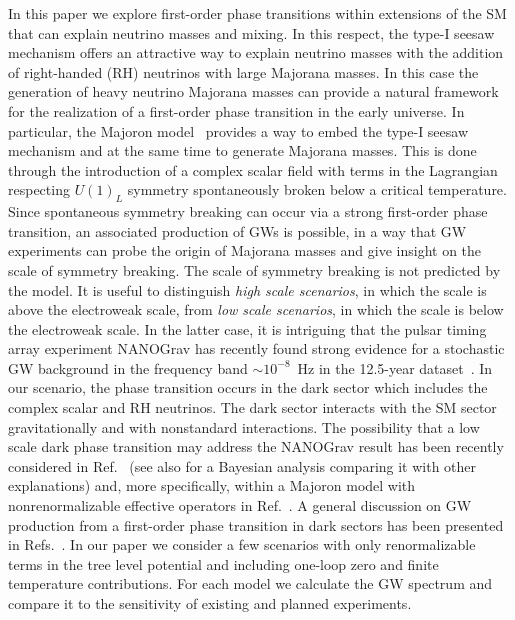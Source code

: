 \documentclass[a4paper,11pt]{article}
\begin{document}
In this paper we explore first-order phase transitions within extensions of the
SM that can explain neutrino masses and mixing. In this respect, the type-I seesaw mechanism 
offers an attractive way to explain neutrino masses with the addition of right-handed (RH) neutrinos with large Majorana masses. 
In this case the generation of heavy neutrino Majorana masses can provide a natural framework for the realization
of a first-order phase transition in the early universe. In particular, the Majoron model~\cite{Chikashige:1980ui} provides a way to embed
the type-I seesaw mechanism and at the same time to generate Majorana masses.  This is done through
the introduction of a complex scalar field with terms in the Lagrangian respecting $U(1)_L$ symmetry
spontaneously broken below a critical temperature.   Since spontaneous symmetry breaking can occur via a strong first-order phase transition, 
an associated production of GWs is possible, in a way that  GW experiments can probe the origin of Majorana masses and give insight 
on the scale of symmetry breaking.  
The scale of symmetry breaking is not predicted by the model. It is useful to distinguish {\it high scale scenarios}, in which the scale is above the electroweak scale, from {\it low scale scenarios},
in which the scale is below the electroweak scale. In the latter
case, it is  intriguing that the pulsar timing array experiment
NANOGrav has recently found  strong evidence for a stochastic GW background in the frequency band 
$\sim 10^{-8}$~Hz in the 12.5-year dataset~\cite{Arzoumanian:2020vkk}.
In our scenario, the phase transition occurs in the dark sector which includes the complex scalar and RH neutrinos.
The dark sector interacts with the SM sector gravitationally and with nonstandard interactions. 
The possibility that a low scale dark phase transition may address the NANOGrav result has been recently 
considered in Ref.~\cite{Nakai:2020oit} (see also \cite{Bian:2021lmz} for a Bayesian analysis comparing it with other explanations) and, more specifically, within a Majoron model with nonrenormalizable 
effective operators in Ref.~\cite{Addazi:2020zcj}. A general discussion on GW production from a first-order phase transition in 
dark sectors has been presented in Refs.~\cite{Breitbach:2018ddu,Fairbairn:2019xog}.
In our paper we consider a few scenarios with only renormalizable terms in the tree level potential
and including one-loop zero and finite temperature contributions. 
For each model we calculate the GW spectrum and compare it to the sensitivity of existing and planned 
experiments. %
\end{document}
